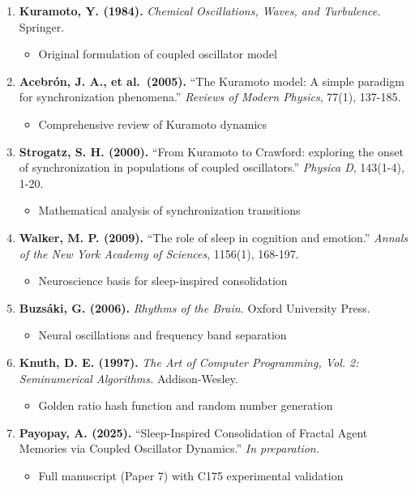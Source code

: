 \documentclass[
]{article}
\providecommand{\tightlist}{%
  \setlength{\itemsep}{0pt}\setlength{\parskip}{0pt}}
\begin{document}
\begin{enumerate}
\def\labelenumi{\arabic{enumi}.}
\tightlist
\item
  \textbf{Kuramoto, Y. (1984).} \emph{Chemical Oscillations, Waves, and
  Turbulence.} Springer.

  \begin{itemize}
  \tightlist
  \item
    Original formulation of coupled oscillator model
  \end{itemize}
\item
  \textbf{Acebrón, J. A., et al.~(2005).} ``The Kuramoto model: A simple
  paradigm for synchronization phenomena.'' \emph{Reviews of Modern
  Physics}, 77(1), 137-185.

  \begin{itemize}
  \tightlist
  \item
    Comprehensive review of Kuramoto dynamics
  \end{itemize}
\item
  \textbf{Strogatz, S. H. (2000).} ``From Kuramoto to Crawford:
  exploring the onset of synchronization in populations of coupled
  oscillators.'' \emph{Physica D}, 143(1-4), 1-20.

  \begin{itemize}
  \tightlist
  \item
    Mathematical analysis of synchronization transitions
  \end{itemize}
\item
  \textbf{Walker, M. P. (2009).} ``The role of sleep in cognition and
  emotion.'' \emph{Annals of the New York Academy of Sciences}, 1156(1),
  168-197.

  \begin{itemize}
  \tightlist
  \item
    Neuroscience basis for sleep-inspired consolidation
  \end{itemize}
\item
  \textbf{Buzsáki, G. (2006).} \emph{Rhythms of the Brain.} Oxford
  University Press.

  \begin{itemize}
  \tightlist
  \item
    Neural oscillations and frequency band separation
  \end{itemize}
\item
  \textbf{Knuth, D. E. (1997).} \emph{The Art of Computer Programming,
  Vol. 2: Seminumerical Algorithms.} Addison-Wesley.

  \begin{itemize}
  \tightlist
  \item
    Golden ratio hash function and random number generation
  \end{itemize}
\item
  \textbf{Payopay, A. (2025).} ``Sleep-Inspired Consolidation of Fractal
  Agent Memories via Coupled Oscillator Dynamics.'' \emph{In
  preparation.}

  \begin{itemize}
  \tightlist
  \item
    Full manuscript (Paper 7) with C175 experimental validation
  \end{itemize}
\end{enumerate}
\end{document}
